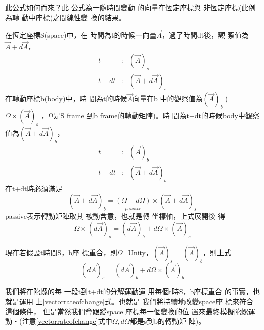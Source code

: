 \documentclass[12pt]{article}
\begin{document}
此公式如何而來？此%
公式為一隨時間變動%
的向量在恆定座標與%
非恆定座標(此例為轉%
動中座標)之間線性變%
換的結果。

\bigskip

在恆定座標S(space)中，在%
時間為t的時候一向量$%
\vec{A}$，過了時間dt後，觀%
察值為$\vec{A}+d\vec{A}$，%
\begin{eqnarray}
t &:&(\vec{A})_{s} \\
t+dt &:&\left( \vec{A}+d\vec{A}\right) _{s}
\end{eqnarray}%
在轉動座標b(body)中，時%
間為t的時候$\vec{A}$向量在b%
中的觀察值為$\left( \vec{A}\right) _{b}$%
(= $\Omega \times \left( \vec{A}\right) _{s}$ ，Ω是S frame%
到b frame的轉動矩陣)。時%
間為t+dt的時候body中觀察%
值為$\left( \vec{A}+d\vec{A}\right) _{b}$，%
\begin{eqnarray}
t &:&\left( \vec{A}\right) _{b} \\
t+dt &:&\left( \vec{A}+d\vec{A}\right) _{b}
\end{eqnarray}%
在t+dt時必須滿足%
\begin{equation}
\left( \vec{A}+d\vec{A}\right) _{b}=\underset{passive}{\left( \Omega
+d\Omega \right) }\times \left( \vec{A}+d\vec{A}\right) _{s}
\label{finiterotmatrix}
\end{equation}%
passive表示轉動矩陣取其%
被動含意，也就是轉%
坐標軸，上式展開後%
得%
\begin{equation}
\Omega \times \left( d\vec{A}\right) _{s}=\left( d\vec{A}\right)
_{b}+d\Omega \times \left( \vec{A}\right) _{s}
\end{equation}

現在若假設t時間S，b座%
標重合，則$\Omega $=Unity，$\left( \vec{A%
}\right) _{s}=\left( \vec{A}\right) _{b}$，則上式%
\begin{equation}
\left( d\vec{A}\right) _{s}=\left( d\vec{A}\right) _{b}+d\Omega \times
\left( \vec{A}\right) _{b}  \label{vectorrateofchange}
\end{equation}

\bigskip 我們將在陀螺的每%
一段t到t+dt的分解運動運%
用每個t時S，b座標重合%
的事實，也就是運用%
上\ref{vectorrateofchange}式。也就是%
我們將持續地改變space座%
標來符合這個條件，%
但是當然我們會跟蹤space%
座標每一個變換的位%
置來最終模擬陀螺運%
動‧(注意\ref{vectorrateofchange}式中$%
\Omega ,d\Omega $都是s到b的轉動矩%
陣)。
\end{document}
